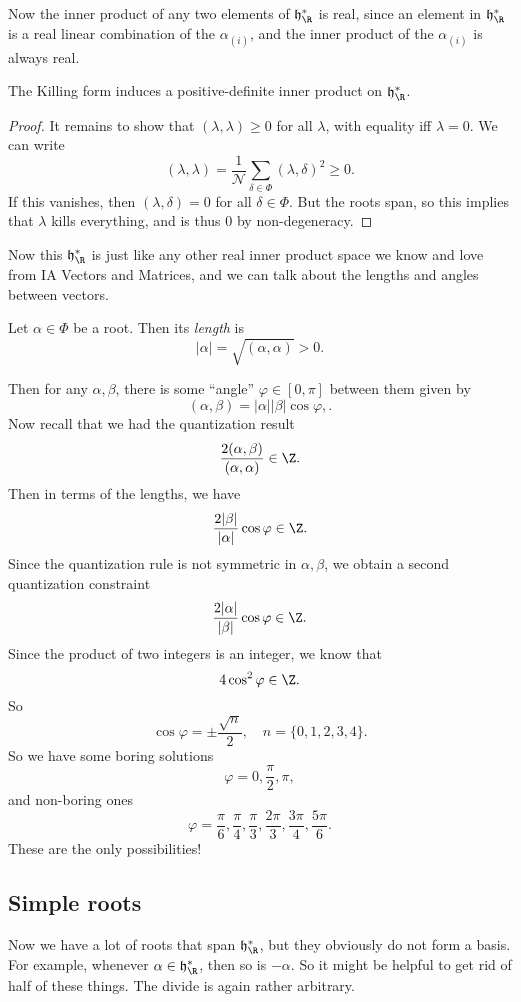 \documentclass[a4paper]{article}
\begin{document}
Now the inner product of any two elements of $\mathfrak{h}_\R^*$ is real, since an element in $\mathfrak{h}_\R^*$ is a real linear combination of the $\alpha_{(i)}$, and the inner product of the $\alpha_{(i)}$ is always real.

\begin{prop}
  The Killing form induces a positive-definite inner product on $\mathfrak{h}_\R^*$.
\end{prop}

\begin{proof}
  It remains to show that $(\lambda, \lambda) \geq 0$ for all $\lambda$, with equality iff $\lambda = 0$. We can write
  \[
    (\lambda, \lambda) = \frac{1}{\mathcal{N}} \sum_{\delta \in \Phi}(\lambda, \delta)^2 \geq 0.
  \]
  If this vanishes, then $(\lambda, \delta) = 0$ for all $\delta \in \Phi$. But the roots span, so this implies that $\lambda$ kills everything, and is thus $0$ by non-degeneracy.
\end{proof}

Now this $\mathfrak{h}_\R^*$ is just like any other real inner product space we know and love from IA Vectors and Matrices, and we can talk about the lengths and angles between vectors.

\begin{defi}
  Let $\alpha \in \Phi$ be a root. Then its \emph{length} is
  \[
    |\alpha| = \sqrt{(\alpha, \alpha)} > 0.
  \]
\end{defi}

Then for any $\alpha, \beta$, there is some ``angle'' $\varphi \in [0, \pi]$ between them given by
\[
  (\alpha, \beta) = |\alpha||\beta| \cos \varphi,.
\]
Now recall that we had the quantization result
\[
  \frac{2(\alpha, \beta)}{(\alpha, \alpha)} \in \Z.
\]
Then in terms of the lengths, we have
\[
  \frac{2 |\beta|}{|\alpha|} \cos \varphi \in \Z.
\]
Since the quantization rule is not symmetric in $\alpha, \beta$, we obtain a second quantization constraint
\[
  \frac{2|\alpha|}{|\beta|} \cos \varphi \in \Z.
\]
Since the product of two integers is an integer, we know that
\[
  4 \cos^2 \varphi \in \Z.
\]
So
\[
  \cos \varphi = \pm \frac{\sqrt{n}}{2}, \quad n = \{0, 1, 2, 3, 4\}.
\]
So we have some boring solutions
\[
  \varphi = 0, \frac{\pi}{2}, \pi,
\]
and non-boring ones
\[
  \varphi = \frac{\pi}{6}, \frac{\pi}{4}, \frac{\pi}{3}, \frac{2\pi}{3}, \frac{3 \pi}{4}, \frac{5 \pi}{6}.
\]
These are the only possibilities!

\subsection{Simple roots}
Now we have a lot of roots that span $\mathfrak{h}^*_\R$, but they obviously do not form a basis. For example, whenever $\alpha \in \mathfrak{h}^*_\R$, then so is $-\alpha$. So it might be helpful to get rid of half of these things. The divide is again rather arbitrary.
\end{document}
